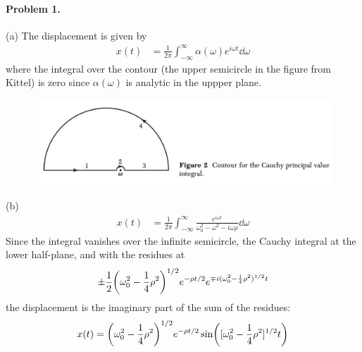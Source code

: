 \documentclass[../main.tex]{subfiles}
\begin{document}
\pagestyle{fancy}

\renewcommand\thefigure{\arabic{figure}} 
\paragraph*{Problem 1.} (a) The displacement is given by
\begin{align*}
    x(t) &= \frac{1}{2\pi} \int_{-\infty}^\infty \alpha(\omega) e^{i \omega t} \dd{\omega}
\end{align*}
where the integral over the contour (the upper semicircle in the figure from Kittel) is zero since 
$\alpha(\omega)$ is
analytic in the uppper plane.
\begin{figure}[ht]
    \centering
    \includegraphics[width=0.8\linewidth]{cauchy.png}
\end{figure}
(b) 
\begin{align*}
    x(t) &= \frac{1}{2\pi} \int_{-\infty}^\infty \frac{ e^{i \omega t}}{\omega_0^2 - \omega^2 - i\omega \rho} \dd{\omega}
\end{align*}
Since the integral vanishes over the infinite semicircle, the Cauchy integral at the lower
half-plane, and with the residues at
\begin{align*}
    \pm \frac{1}{2} \qt(\omega_0^2 - \frac{1}{4} \rho^2)^{1/2} e^{-\rho t /2} e^{\mp i(\omega_0^2 - \frac{1}{4} \rho^2)^{1/2} t}
\end{align*}
the displacement is the imaginary part of the sum of the residues:
\begin{align*}
    x(t) = \qt(\omega_0^2 - \frac{1}{4} \rho^2)^{1/2} e^{-\rho t /2} \sin([\omega_0^2 - \frac{1}{4} \rho^2]^{1/2}t)
\end{align*}
\end{document}
